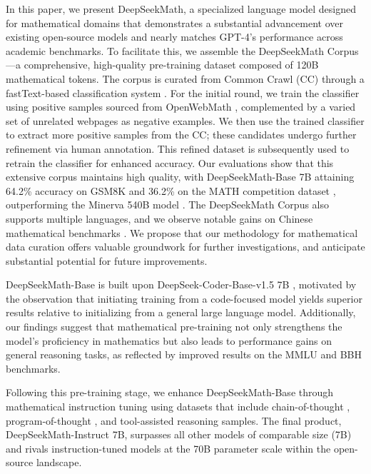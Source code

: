 In this paper, we present DeepSeekMath, a specialized language model designed for mathematical domains that demonstrates a substantial advancement over existing open-source models and nearly matches GPT-4’s performance across academic benchmarks. To facilitate this, we assemble the DeepSeekMath Corpus—a comprehensive, high-quality pre-training dataset composed of 120B mathematical tokens. The corpus is curated from Common Crawl (CC) through a fastText-based classification system \citep{joulin2016fasttext}. For the initial round, we train the classifier using positive samples sourced from OpenWebMath \citep{openwebmath}, complemented by a varied set of unrelated webpages as negative examples. We then use the trained classifier to extract more positive samples from the CC; these candidates undergo further refinement via human annotation. This refined dataset is subsequently used to retrain the classifier for enhanced accuracy. Our evaluations show that this extensive corpus maintains high quality, with DeepSeekMath-Base 7B attaining 64.2\% accuracy on GSM8K \citep{gsm8k} and 36.2\% on the MATH competition dataset \citep{MATH}, outperforming the Minerva 540B model \citep{minerva}. The DeepSeekMath Corpus also supports multiple languages, and we observe notable gains on Chinese mathematical benchmarks \citep{wei2023cmath,agieval}. We propose that our methodology for mathematical data curation offers valuable groundwork for further investigations, and anticipate substantial potential for future improvements.

DeepSeekMath-Base is built upon DeepSeek-Coder-Base-v1.5 7B \citep{deepseek-coder}, motivated by the observation that initiating training from a code-focused model yields superior results relative to initializing from a general large language model. Additionally, our findings suggest that mathematical pre-training not only strengthens the model’s proficiency in mathematics but also leads to performance gains on general reasoning tasks, as reflected by improved results on the MMLU \citep{mmlu} and BBH \citep{bbh} benchmarks.

Following this pre-training stage, we enhance DeepSeekMath-Base through mathematical instruction tuning using datasets that include chain-of-thought \citep{cot}, program-of-thought \citep{pot,pal}, and tool-assisted reasoning \citep{tora} samples. The final product, DeepSeekMath-Instruct 7B, surpasses all other models of comparable size (7B) and rivals instruction-tuned models at the 70B parameter scale within the open-source landscape.

